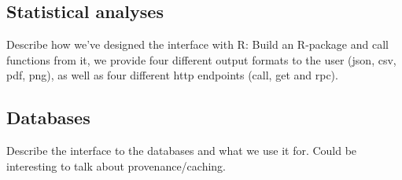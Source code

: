 

%

\subsection*{Statistical analyses}
Describe how we've designed the interface with R: Build an R-package and call
functions from it, we provide four different output formats to the user
 (json, csv, pdf, png),  as well as four different http endpoints (call, get and
rpc).

%
\subsection*{Databases}
Describe the interface to the databases and what we use it for. Could be
interesting to talk about provenance/caching.

